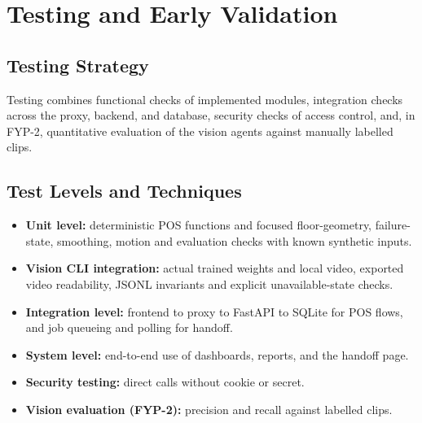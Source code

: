 \chapter{Testing and Early Validation}
\label{ch:testing}
\section{Testing Strategy}
Testing combines functional checks of implemented modules, integration checks across the proxy, backend, and database, security checks of access control, and, in FYP-2, quantitative evaluation of the vision agents against manually labelled clips.

\section{Test Levels and Techniques}
\begin{itemize}
\item \textbf{Unit level:} deterministic POS functions and focused floor-geometry, failure-state, smoothing, motion and evaluation checks with known synthetic inputs.
\item \textbf{Vision CLI integration:} actual trained weights and local video, exported video readability, JSONL invariants and explicit unavailable-state checks.
\item \textbf{Integration level:} frontend to proxy to FastAPI to SQLite for POS flows, and job queueing and polling for handoff.
\item \textbf{System level:} end-to-end use of dashboards, reports, and the handoff page.
\item \textbf{Security testing:} direct calls without cookie or secret.
\item \textbf{Vision evaluation (FYP-2):} precision and recall against labelled clips.
\end{itemize}

